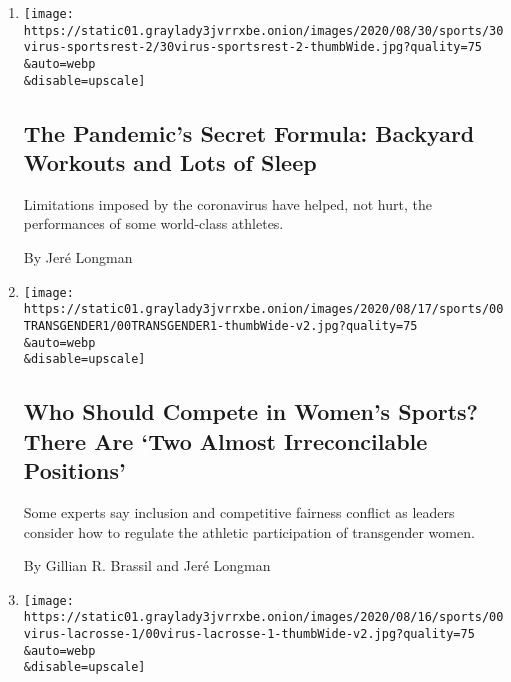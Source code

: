 \begin{enumerate}
\def\labelenumi{\arabic{enumi}.}
\item
  \href{/2020/08/30/sports/olympics/pandemic-olympics-training.html}{}

  \texttt{[image: https://static01.graylady3jvrrxbe.onion/images/2020/08/30/sports/30virus-sportsrest-2/30virus-sportsrest-2-thumbWide.jpg?quality=75\\\&auto=webp\\\&disable=upscale]}

  \hypertarget{the-pandemics-secret-formula-backyard-workouts-and-lots-of-sleep}{%
  \subsection{The Pandemic's Secret Formula: Backyard Workouts and Lots
  of
  Sleep}\label{the-pandemics-secret-formula-backyard-workouts-and-lots-of-sleep}}

  Limitations imposed by the coronavirus have helped, not hurt, the
  performances of some world-class athletes.

  By Jeré Longman
\item
  \href{/2020/08/18/sports/transgender-athletes-womens-sports-idaho.html}{}

  \texttt{[image: https://static01.graylady3jvrrxbe.onion/images/2020/08/17/sports/00TRANSGENDER1/00TRANSGENDER1-thumbWide-v2.jpg?quality=75\\\&auto=webp\\\&disable=upscale]}

  \hypertarget{who-should-compete-in-womens-sports-there-are-two-almost-irreconcilable-positions}{%
  \subsection{Who Should Compete in Women's Sports? There Are `Two
  Almost Irreconcilable
  Positions'}\label{who-should-compete-in-womens-sports-there-are-two-almost-irreconcilable-positions}}

  Some experts say inclusion and competitive fairness conflict as
  leaders consider how to regulate the athletic participation of
  transgender women.

  By Gillian R. Brassil and Jeré Longman
\item
  \href{/2020/08/13/sports/lacrosse-recruiting-coronavirus.html}{}

  \texttt{[image: https://static01.graylady3jvrrxbe.onion/images/2020/08/16/sports/00virus-lacrosse-1/00virus-lacrosse-1-thumbWide-v2.jpg?quality=75\\\&auto=webp\\\&disable=upscale]}

  \hypertarget{lacrosse-plays-on-in-the-pandemic-creating-tough-calls-for-families}{%
}
\end{enumerate}

